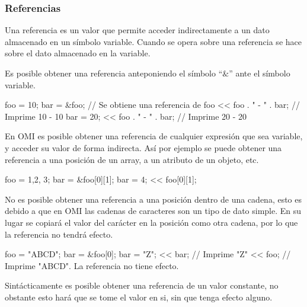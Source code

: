 

\subsubsection{Referencias}
Una referencia es un valor que permite acceder indirectamente a un dato almacenado en un símbolo variable. Cuando 
se opera sobre una referencia se hace sobre el dato almacenado en la variable.

Es posible obtener una referencia anteponiendo el símbolo ``$\&$'' ante el símbolo variable. \\

\begin{myverbatim}
   foo = 10;
   bar = &foo; // Se obtiene una referencia de foo
   << foo . " - " . bar; // Imprime 10 - 10
   bar = 20; 
   << foo . " - " . bar; // Imprime 20 - 20 
\end{myverbatim}

En OMI es posible obtener una referencia de cualquier expresión que sea variable, y acceder su valor de forma indirecta. Así por
ejemplo se puede obtener una referencia a una posición de un array, a un atributo de un objeto, etc. \\

\begin{myverbatim}
   foo = {{1,2}, 3}; 
   bar = &foo[0][1];
   bar = 4;
   << foo[0][1];
\end{myverbatim}

No es posible obtener una referencia a una posición dentro de una cadena, esto es debido a que en OMI las cadenas de caracteres son un tipo de dato simple.  
En su lugar se copiará el valor del carácter en la posición como otra cadena, por lo que la referencia no tendrá efecto. \\

\begin{myverbatim}
   foo = "ABCD"; 
   bar = &foo[0];
   bar = "Z";
   << bar; // Imprime "Z"
   << foo; // Imprime "ABCD". La referencia no tiene efecto.
\end{myverbatim}

Sintácticamente es posible obtener una referencia de un valor constante, no obstante esto hará que se tome el valor en si, sin que tenga efecto alguno.

